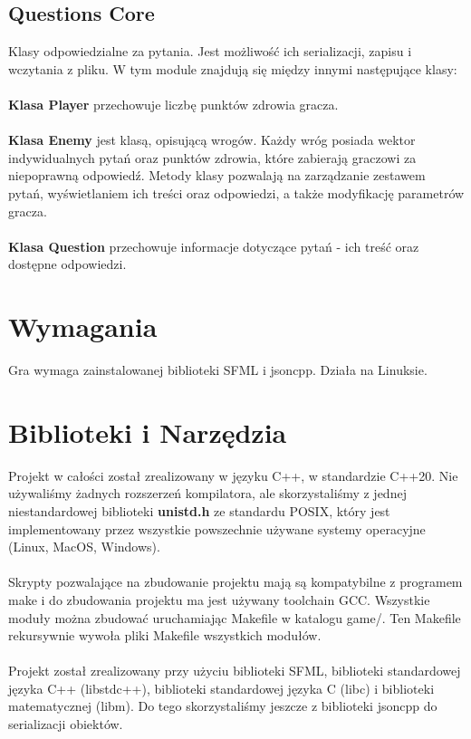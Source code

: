 \documentclass[12pt, titlepage]{article}
\begin{document}
\subsection{Questions Core}
Klasy odpowiedzialne za pytania.
Jest możliwość ich serializacji,
zapisu i wczytania z pliku.
W tym module znajdują się między
innymi następujące klasy:
\\~\\
\textbf{Klasa Player} przechowuje
liczbę punktów zdrowia gracza.
\\~\\
\textbf{Klasa Enemy} jest klasą,
opisującą wrogów. Każdy wróg posiada 
wektor indywidualnych pytań oraz
punktów zdrowia, które zabierają
graczowi za niepoprawną
odpowiedź. Metody klasy
pozwalają na zarządzanie zestawem
pytań, wyświetlaniem ich treści
oraz odpowiedzi, a także 
modyfikację parametrów gracza.
\\~\\
\textbf{Klasa Question} przechowuje
informacje dotyczące pytań - ich
treść oraz dostępne odpowiedzi.

\section{Wymagania}
Gra wymaga zainstalowanej biblioteki
SFML i jsoncpp. Działa na Linuksie. 

\section{Biblioteki i Narzędzia}
Projekt w całości został zrealizowany
w języku C++, w standardzie C++20.
Nie używaliśmy żadnych rozszerzeń
kompilatora, ale skorzystaliśmy
z jednej niestandardowej biblioteki
\textbf{unistd.h} ze standardu POSIX,
który jest implementowany przez
wszystkie powszechnie używane systemy
operacyjne (Linux, MacOS, Windows).
\\~\\
Skrypty pozwalające na zbudowanie
projektu mają są kompatybilne z
programem make i do zbudowania
projektu ma jest używany toolchain
GCC. Wszystkie moduły można zbudować
uruchamiając Makefile w katalogu game/.
Ten Makefile rekursywnie wywoła
pliki Makefile wszystkich modułów.
\\~\\
Projekt został zrealizowany przy
użyciu biblioteki SFML, biblioteki
standardowej języka C++ (libstdc++),
biblioteki standardowej języka C (libc)
i biblioteki matematycznej (libm).
Do tego skorzystaliśmy jeszcze z
biblioteki jsoncpp do serializacji
obiektów.
\end{document}
